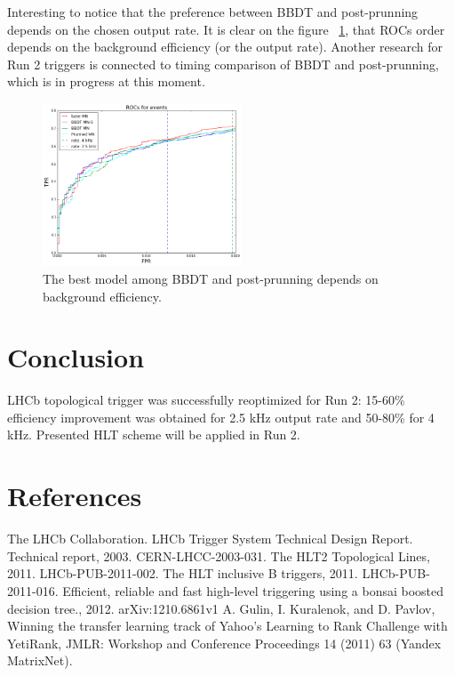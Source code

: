 \documentclass[a4paper]{jpconf}
\begin{document}
Interesting to notice that the preference between BBDT and post-prunning depends on the chosen output rate. It is clear on the figure~ \ref{hlt2_prunroc}, that ROCs order depends on the background efficiency (or the output rate). Another research for Run 2 triggers is connected to timing comparison of BBDT and post-prunning, which is in progress at this moment.

\begin{figure}[h]
\includegraphics[width=14pc]{../images/prun-roc}\hspace{2pc}%
\begin{minipage}[b]{22pc}\caption{\label{hlt2_prunroc} The best model among BBDT and post-prunning depends on background efficiency.}
\end{minipage}
\end{figure}


\section{Conclusion}
LHCb topological trigger was successfully reoptimized for Run 2: 15-60\% efficiency improvement was obtained for 2.5 kHz output rate and 50-80\% for 4 kHz. Presented HLT scheme will be applied in Run 2.

\section*{References}
\begin{thebibliography}{9}
 The LHCb Collaboration. LHCb Trigger System Technical Design Report. Technical report, 2003. CERN-LHCC-2003-031.
 The HLT2 Topological Lines, 2011. LHCb-PUB-2011-002. 
 The HLT inclusive B triggers, 2011. LHCb-PUB-2011-016. 
 Efficient, reliable and fast high-level triggering using a bonsai boosted decision tree., 2012. arXiv:1210.6861v1
 A. Gulin, I. Kuralenok, and D. Pavlov, Winning the transfer learning track of Yahoo's Learning to Rank Challenge with YetiRank, JMLR: Workshop and Conference Proceedings 14 (2011) 63 (Yandex MatrixNet).
\end{thebibliography}
\end{document}
